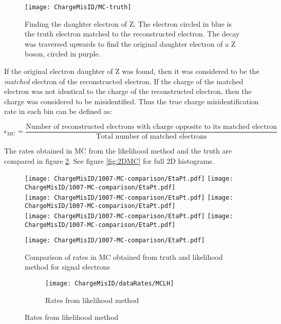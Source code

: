 \begin{figure}[h!]
\centering
\texttt{[image: ChargeMisID/MC-truth]}
\caption[Finding the original daughter electron of Z]{Finding the  daughter electron of Z. The electron circled in blue is the truth electron matched to the reconstructed electron. The decay was traversed upwards to find the original daughter electron of a Z boson, circled in purple.}
\label{fig:find-daughter-electron}
\end{figure}

If the original electron daughter of Z was found, then it was considered to be the \textit{matched} electron of the reconstructed electron. If the charge of the matched electron was not identical to the charge of the reconstructed electron, then the charge was considered to be misidentified. Thus the true charge misidentification rate in each bin can be defined as:

\begin{equation}
\epsilon_{\text{MC}} = \frac{\text{Number of reconstructed electrons with charge opposite to its matched electron}}{\text{Total number of matched electrons}}
\end{equation}

The rates obtained in MC from the likelihood method and the truth are compared in figure \ref{fig:MCrates}. See figure \ref{fig:2DMC} for full 2D histograms.

\begin{figure}[h]
\centering
\texttt{[image: ChargeMisID/1007-MC-comparison/EtaPt.pdf]}
\texttt{[image: ChargeMisID/1007-MC-comparison/EtaPt.pdf]}\\
\texttt{[image: ChargeMisID/1007-MC-comparison/EtaPt.pdf]}
\texttt{[image: ChargeMisID/1007-MC-comparison/EtaPt.pdf]}\\
\texttt{[image: ChargeMisID/1007-MC-comparison/EtaPt.pdf]}
\texttt{[image: ChargeMisID/1007-MC-comparison/EtaPt.pdf]}
\end{figure}

\begin{figure}[h]
\ContinuedFloat
\centering
\texttt{[image: ChargeMisID/1007-MC-comparison/EtaPt.pdf]}
\caption{Comparison of rates in MC obtained from truth and likelihood method for signal electrons}
\label{fig:MCrates}
\end{figure}

\begin{figure}[h]
\begin{subfigure}[t]{\textwidth}
\centering
\texttt{[image: ChargeMisID/dataRates/MCLH]}
\caption{Rates from likelihood method}
\end{subfigure}
\end{figure}

